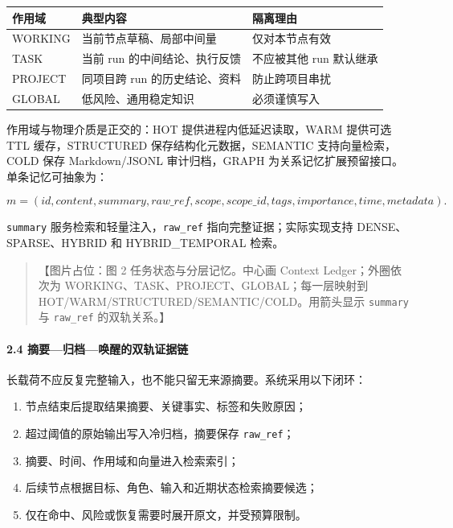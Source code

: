 \documentclass[UTF8,a4paper,12pt]{ctexart}
\providecommand{\tightlist}{%
  \setlength{\itemsep}{0pt}\setlength{\parskip}{0pt}}
\begin{document}
\begin{longtable}[]{@{}lll@{}}
\toprule
作用域 & 典型内容 & 隔离理由 \\
\midrule
\endhead
WORKING & 当前节点草稿、局部中间量 & 仅对本节点有效 \\
TASK & 当前 run 的中间结论、执行反馈 & 不应被其他 run 默认继承 \\
PROJECT & 同项目跨 run 的历史结论、资料 & 防止跨项目串扰 \\
GLOBAL & 低风险、通用稳定知识 & 必须谨慎写入 \\
\bottomrule
\end{longtable}

作用域与物理介质是正交的：HOT 提供进程内低延迟读取，WARM 提供可选 TTL 缓存，STRUCTURED 保存结构化元数据，SEMANTIC 支持向量检索，COLD 保存 Markdown/JSONL 审计归档，GRAPH 为关系记忆扩展预留接口。单条记忆可抽象为：

\[
m=(id,content,summary,raw\_ref,scope,scope\_id,tags,importance,time,metadata).
\]

\texttt{summary} 服务检索和轻量注入，\texttt{raw\_ref} 指向完整证据；实际实现支持 DENSE、SPARSE、HYBRID 和 HYBRID\_TEMPORAL 检索。

\begin{quote}
【图片占位：图 2 任务状态与分层记忆。中心画 Context Ledger；外圈依次为 WORKING、TASK、PROJECT、GLOBAL；每一层映射到 HOT/WARM/STRUCTURED/SEMANTIC/COLD。用箭头显示 \texttt{summary} 与 \texttt{raw\_ref} 的双轨关系。】
\end{quote}

\paragraph{2.4 摘要—归档—唤醒的双轨证据链}

长载荷不应反复完整输入，也不能只留无来源摘要。系统采用以下闭环：

\begin{enumerate}
\def\labelenumi{\arabic{enumi}.}
\tightlist
\item
  节点结束后提取结果摘要、关键事实、标签和失败原因；
\item
  超过阈值的原始输出写入冷归档，摘要保存 \texttt{raw\_ref}；
\item
  摘要、时间、作用域和向量进入检索索引；
\item
  后续节点根据目标、角色、输入和近期状态检索摘要候选；
\item
  仅在命中、风险或恢复需要时展开原文，并受预算限制。
\end{enumerate}
\end{document}
